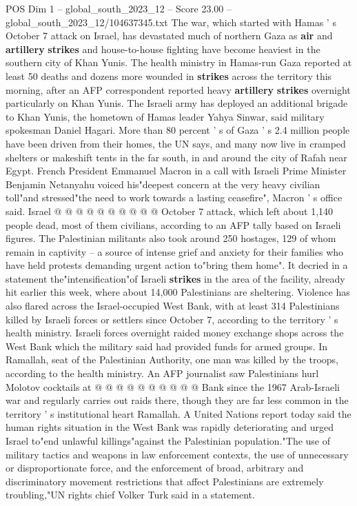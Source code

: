 \begin{textsample}{POS Dim 1 – global\_south\_2023\_12 – Score 23.00 – global\_south\_2023\_12/104637345.txt}  \label{ex:f1_pos_161}
The war, which started with Hamas ' s October 7 attack on Israel, has devastated much of northern Gaza as \textbf{air} and \textbf{artillery} \textbf{strikes} and house-to-house fighting have become heaviest in the southern city of Khan Yunis.
The health ministry in Hamas-run Gaza reported at least 50 deaths and dozens more wounded in \textbf{strikes} across the territory this morning, after an AFP correspondent reported heavy \textbf{artillery} \textbf{strikes} overnight particularly on Khan Yunis.
The Israeli army has deployed an additional brigade to Khan Yunis, the hometown of Hamas leader Yahya Sinwar, said military spokesman Daniel Hagari.
More than 80 percent ' s of Gaza ' s 2.4 million people have been driven from their homes, the UN says, and many now live in cramped shelters or makeshift tents in the far south, in and around the city of Rafah near Egypt.
French President Emmanuel Macron in a call with Israeli Prime Minister Benjamin Netanyahu voiced his"deepest concern at the very heavy civilian toll"and stressed"the need to work towards a lasting ceasefire", Macron ' s office said.
Israel @ @ @ @ @ @ @ @ @ @ October 7 attack, which left about 1,140 people dead, most of them civilians, according to an AFP tally based on Israeli figures.
The Palestinian militants also took around 250 hostages, 129 of whom remain in captivity -- a source of intense grief and anxiety for their families who have held protests demanding urgent action to"bring them home".
It decried in a statement the"intensification"of Israeli \textbf{strikes} in the area of the facility, already hit earlier this week, where about 14,000 Palestinians are sheltering.
Violence has also flared across the Israel-occupied West Bank, with at least 314 Palestinians killed by Israeli forces or settlers since October 7, according to the territory ' s health ministry.
Israeli forces overnight raided money exchange shops across the West Bank which the military said had provided funds for armed groups.
In Ramallah, seat of the Palestinian Authority, one man was killed by the troops, according to the health ministry.
An AFP journalist saw Palestinians hurl Molotov cocktails at @ @ @ @ @ @ @ @ @ @ Bank since the 1967 Arab-Israeli war and regularly carries out raids there, though they are far less common in the territory ' s institutional heart Ramallah.
A United Nations report today said the human rights situation in the West Bank was rapidly deteriorating and urged Israel to"end unlawful killings"against the Palestinian population."The use of military tactics and weapons in law enforcement contexts, the use of unnecessary or disproportionate force, and the enforcement of broad, arbitrary and discriminatory movement restrictions that affect Palestinians are extremely troubling,"UN rights chief Volker Turk said in a statement.

\end{textsample}
